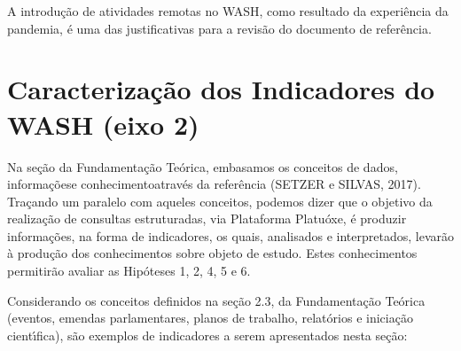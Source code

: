 \documentclass[
12pt,		%
openright,	%
twoside,  %
a4paper,			%
chapter=TITLE,		%
english,			%
french,				%
spanish,			%
brazil				%
]{USPSC-classe/USPSC}
\begin{document}
A introdu\c{c}\~ao de atividades remotas no WASH, como resultado da experi\^encia da pandemia, \'e uma das justificativas para a revis\~ao do documento de refer\^encia.









\section[Caracteriza\c{c}\~ao dos Indicadores do WASH (eixo 2)]{Caracteriza\c{c}\~ao dos Indicadores do WASH (eixo 2)}\label{Caracteriza\c{c}\~ao dos Indicadores do WASH (eixo 2)}
Na se\c{c}\~ao da Fundamenta\c{c}\~ao Te\'orica, embasamos os conceitos de \textquotedbl dados\textquotedbl , \textquotedbl informa\c{c}\~oes\textquotedbl  e \textquotedbl conhecimento\textquotedbl   atrav\'es da refer\^encia (SETZER  e SILVAS, 2017). Tra\c{c}ando um paralelo com aqueles conceitos, podemos dizer que o objetivo da realiza\c{c}\~ao de consultas estruturadas, via Plataforma \textquotedbl Platu\'oxe\textquotedbl , \'e produzir informa\c{c}\~oes, na forma de indicadores, os quais, analisados e interpretados, levar\~ao \`a produ\c{c}\~ao dos conhecimentos sobre objeto de estudo. Estes conhecimentos permitir\~ao avaliar as Hip\'oteses 1, 2, 4, 5 e 6.









Considerando os conceitos definidos na se\c{c}\~ao 2.3, da Fundamenta\c{c}\~ao Te\'orica (eventos, emendas parlamentares, planos de trabalho, relat\'orios e inicia\c{c}\~ao cient\'{\i}fica), s\~ao exemplos de indicadores a serem apresentados nesta se\c{c}\~ao:
\end{document}
